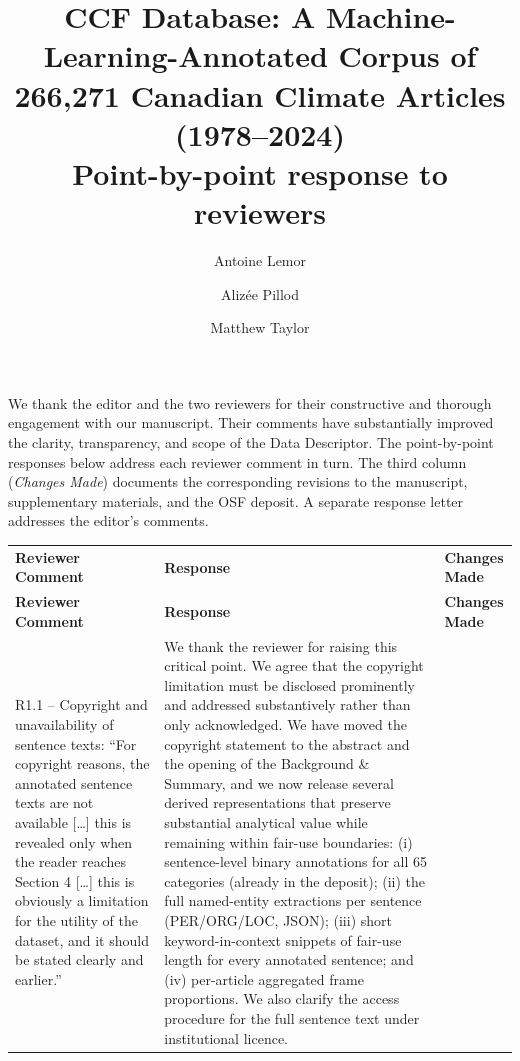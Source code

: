 \documentclass[11pt]{article}
\title{\textbf{CCF Database: A Machine-Learning-Annotated Corpus of 266{,}271 Canadian Climate Articles (1978--2024)}\\[0.4em]
\large Point-by-point response to reviewers}
\author{Antoine Lemor \and Aliz\'ee Pillod \and Matthew Taylor}
\date{}
\begin{document}
\maketitle

\noindent We thank the editor and the two reviewers for their constructive and thorough engagement with our manuscript. Their comments have substantially improved the clarity, transparency, and scope of the Data Descriptor. The point-by-point responses below address each reviewer comment in turn. The third column (\emph{Changes Made}) documents the corresponding revisions to the manuscript, supplementary materials, and the OSF deposit. A separate response letter addresses the editor's comments.

\vspace{1em}

\begin{landscape}


\begin{longtable}{|L{4cm}|L{12cm}|L{9cm}|}
\hline
{}
 \\
\hline
\textbf{Reviewer Comment} & \textbf{Response} & \textbf{Changes Made} \\
\hline
\endfirsthead
\hline
{}
\textbf{Reviewer Comment} & \textbf{Response} & \textbf{Changes Made} \\
\hline
\endhead

R1.1 -- Copyright and unavailability of sentence texts: \enquote{For copyright reasons, the annotated sentence texts are not available [\dots] this is revealed only when the reader reaches Section 4 [\dots] this is obviously a limitation for the utility of the dataset, and it should be stated clearly and earlier.} &
We thank the reviewer for raising this critical point. We agree that the copyright limitation must be disclosed prominently and addressed substantively rather than only acknowledged. We have moved the copyright statement to the abstract and the opening of the Background \& Summary, and we now release several derived representations that preserve substantial analytical value while remaining within fair-use boundaries: (i) sentence-level binary annotations for all 65 categories (already in the deposit); (ii) the full named-entity extractions per sentence (PER/ORG/LOC, JSON); (iii) short keyword-in-context snippets of fair-use length for every annotated sentence; and (iv) per-article aggregated frame proportions. We also clarify the access procedure for the full sentence text under institutional licence. &
\\
\hline


\end{longtable}
\end{landscape}
\end{document}
